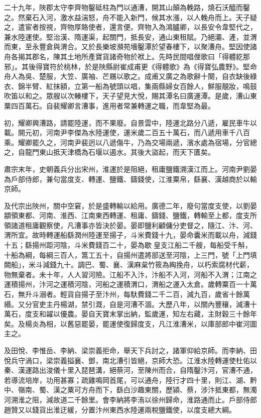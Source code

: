 \begin{pinyinscope}
 二十九年，陜郡太守李齊物鑿砥柱為門以通漕，開其山顛為輓路，燒石沃醯而鑿之。然棄石入河，激水益湍怒，舟不能入新門，候其水漲，以人輓舟而上。天子疑之，遣宦者按視，齊物厚賂使者，還言便。齊物入為鴻臚卿，以長安令韋堅代之，兼水陸運使。堅治漢、隋運渠，起關門，抵長安，通山東租賦。乃絕灞、滻，並渭而東，至永豐倉與渭合。又於長樂坡瀕苑墻鑿潭於望春樓下，以聚漕舟。堅因使諸舟各揭其郡名，陳其土地所產寶貨諸奇物於袱上。先時民間唱俚歌曰「得體紇那邪」。其後得寶符於桃林，於是陜縣尉崔成甫更《得體歌》為《得寶弘農野》。堅命舟人為吳、楚服，大笠、廣袖、芒屩以歌之。成甫又廣之為歌辭十闋，自衣缺後綠衣、錦半臂、紅抹額，立第一船為號頭以唱，集兩縣婦女百餘人，鮮服靚妝，鳴鼓吹笛以和之。眾艘以次輳樓下，天子望見大悅，賜其潭名曰廣運潭。是歲，漕山東粟四百萬石。自裴耀卿言漕事，進用者常兼轉運之職，而韋堅為最。



 初，耀卿興漕路，請罷陸運，而不果廢。自景雲中，陸運北路分八遞，雇民車牛以載。開元初，河南尹李傑為水陸運使，運米歲二百五十萬石，而八遞用車千八百乘。耀卿罷久之，河南尹裴迥以八遞傷牛，乃為交場兩遞，濱水處為宿場，分官總之，自龍門東山抵天津橋為石堰以遏水。其後大盜起，而天下匱矣。



 肅宗末年，史朝義兵分出宋州，淮運於是阻絕，租庸鹽鐵溯漢江而上。河南尹劉晏為戶部侍郎，兼句當度支、轉運、鹽鐵、鑄錢使，江淮粟帛，繇襄、漢越商於以輸京師。



 及代宗出陜州，關中空窘，於是盛轉輸以給用。廣德二年，廢句當度支使，以劉晏顓領東都、河南、淮西、江南東西轉運、租庸、鑄錢、鹽鐵，轉輸至上都，度支所領諸道租庸觀察使，凡漕事亦皆決於晏。晏即鹽利顧傭分吏督之，隨江、汴、河、渭所宜。故時轉運船繇潤州陸運至揚子，斗米費錢十九，晏命囊米而載以舟，減錢十五；繇揚州距河陰，斗米費錢百二十，晏為歇皇支江船二千艘，每船受千斛，十船為綱，每綱三百人，篙工五十，自揚州遣將部送至河陰，上三門，號「上門填闕船」，米斗減錢九十。調巴、蜀、襄、漢麻枲竹筱為綯挽舟，以朽索腐材代薪，物無棄者。未十年，人人習河險。江船不入汴，汴船不入河，河船不入渭；江南之運積揚州，汴河之運積河陰，河船之運積渭口，渭船之運入太倉。歲轉粟百一十萬石，無升斗溺者。輕貨自揚子至汴州，每馱費錢二千二百，減九百，歲省十餘萬緡。又分官吏主丹楊湖，禁引溉，自是河漕不涸。大歷八年，以關內豐穰，減漕十萬石，度支和糴以優農。晏自天寶末掌出納，監歲運，知左右藏，主財穀三十餘年矣。及楊炎為相，以舊惡罷晏，罷運使復歸度支，凡江淮漕米，以庫部郎中崔河圖主之。



 及田悅、李惟岳、李納、梁崇義拒命，舉天下兵討之，諸軍仰給京師。而李納、田悅兵守渦口，梁崇義搤襄、鄧，南北漕引皆絕，京師大恐。江淮水陸轉運使杜佑以秦、漢運路出浚儀十里入琵琶溝，絕蔡河，至陳州而合，自隋鑿汴河，官漕不通，若導流培岸，功用甚寡；疏雞鳴岡首尾，可以通舟，陸行才四十里，則江、湖、黔中、嶺南、蜀、漢之粟可方舟而下，繇白沙趣東關，歷潁、蔡，涉汴抵東都，無濁河溯淮之阻，減故道二千餘里。會李納將李洧以徐州歸命，淮路通而止。戶部侍郎趙贊又以錢貨出淮迂緩，分置汴州東西水陸運兩稅鹽鐵使，以度支總大綱。




\end{pinyinscope}
